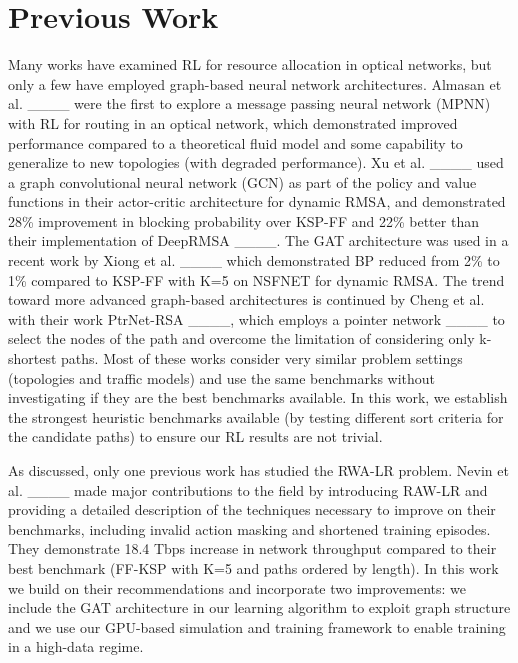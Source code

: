 \section{Previous Work}
Many works have examined RL for resource allocation in optical networks, but only a few have employed graph-based neural network architectures. Almasan et al. ____ were the first to explore a message passing neural network (MPNN) with RL for routing in an optical network, which demonstrated improved performance compared to a theoretical fluid model and some capability to generalize to new topologies (with degraded performance). Xu et al. ____ used a graph convolutional neural network (GCN) as part of the policy and value functions in their actor-critic architecture for dynamic RMSA, and demonstrated 28\% improvement in blocking probability over KSP-FF and 22\% better than their implementation of DeepRMSA ____. The GAT architecture was used in a recent work by Xiong et al. ____ which demonstrated BP reduced from 2\% to 1\% compared to KSP-FF with K=5 on NSFNET for dynamic RMSA. The trend toward more advanced graph-based architectures is continued by Cheng et al. with their work PtrNet-RSA ____, which employs a pointer network ____ to select the nodes of the path and overcome the limitation of considering only k-shortest paths. Most of these works consider very similar problem settings (topologies and traffic models) and use the same benchmarks without investigating if they are the best benchmarks available. In this work, we establish the strongest heuristic benchmarks available (by testing different sort criteria for the candidate paths) to ensure our RL results are not trivial.

As discussed, only one previous work has studied the RWA-LR problem. Nevin et al. ____ made major contributions to the field by introducing RAW-LR and providing a detailed description of the techniques necessary to improve on their benchmarks, including invalid action masking and shortened training episodes. They demonstrate 18.4 Tbps increase in network throughput compared to their best benchmark (FF-KSP with K=5 and paths ordered by length). In this work we build on their recommendations and incorporate two improvements: we include the GAT architecture in our learning algorithm to exploit graph structure and we use our GPU-based simulation and training framework to enable training in a high-data regime.

